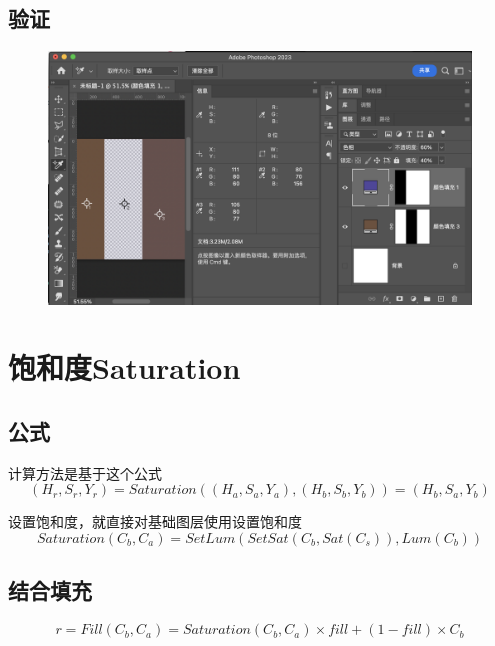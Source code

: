 \subsection{ 验证}
\begin{figure}[h!]
	\centering
	\includegraphics[width=\linewidth]{figure/hue}
	\caption{}
	\label{fig:hue}
\end{figure}
\newpage
\section{ 饱和度Saturation}
\subsection{ 公式}
计算方法是基于这个公式
\begin{equation}(H_r,S_r,Y_r)= Saturation((H_a,S_a,Y_a),(H_b,S_b,Y_b))=(H_b,S_a,Y_b)\end{equation}

设置饱和度，就直接对基础图层使用设置饱和度
\begin{equation}Saturation(C_b,C_a)=SetLum(SetSat(C_b,Sat(C_s)),Lum(C_b))\end{equation}

\subsection{ 结合填充}

\begin{equation}r=Fill(C_b,C_a)= Saturation(C_b,C_a)\times fill + (1-fill)\times C_b\end{equation}

